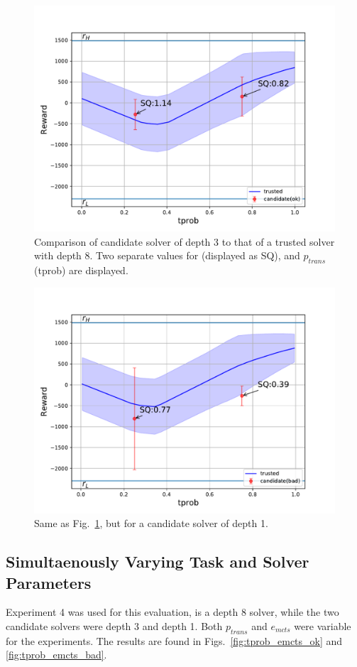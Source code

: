 \begin{figure}[tbp]
    \centering
    \includegraphics[width=0.9\linewidth]{Figures/transition_vary_tprob_ok.pdf}
    \caption{Comparison of candidate solver of depth 3 to that of a trusted solver with depth 8. Two separate values for \xQ{} (displayed as SQ), and $p_{trans}$ (tprob) are displayed.}
    \label{fig:tprob_ok}
\end{figure}
\begin{figure}[tbp]
    \centering
    \includegraphics[width=0.9\linewidth]{Figures/transition_vary_tprob_bad.pdf}
    \caption{Same as Fig.~\ref{fig:tprob_ok}, but for a candidate solver of depth 1.}
    \label{fig:tprob_bad}
\end{figure}

\subsection{Simultaenously Varying Task and Solver Parameters}
Experiment 4 was used for this evaluation, \solverstar{} is a depth 8 solver, while the two candidate solvers were depth 3 and depth 1. Both $p_{trans}$ and $e_{mcts}$ were variable for the experiments. The results are found in Figs.~\ref{fig:tprob_emcts_ok} and \ref{fig:tprob_emcts_bad}.

